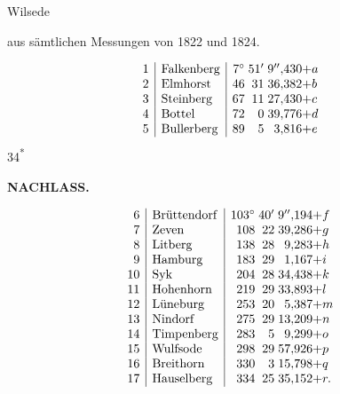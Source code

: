 \medskip
{\centering
[3.]\par\smallskip
Wilsede\par\smallskip
aus sämtlichen Messungen von 1822 und 1824.\par\smallskip
[Annahme.]\par}
\[
\begin{array}{@{}r|l|r@{\;}r@{\;}r@{}l@{}}
 1&\text{Falkenberg}&7^\circ&51'&9''{,}430&+a\\
 2&\text{Elmhorst}&46&31&36{,}382&+b\\
 3&\text{Steinberg}&67&11&27{,}430&+c\\
 4&\text{Bottel}&72&0&39{,}776&+d\\
 5&\text{Bullerberg}&89&5&3{,}816&+e
\end{array}
\]
\noindent\hfill{\small 34\textsuperscript{*}}\hspace*{.12\linewidth}\par

\par\clearpage
\noindent{}\hfill{\small\textbf{NACHLASS.}}\hfill\null\par\medskip

\[
\begin{array}{@{}r|l|r@{\;}r@{\;}r@{}l@{}}
 6&\text{Brüttendorf}&103^\circ&40'&9''{,}194&+f\\
 7&\text{Zeven}&108&22&39{,}286&+g\\
 8&\text{Litberg}&138&28&9{,}283&+h\\
 9&\text{Hamburg}&183&29&1{,}167&+i\\
 10&\text{Syk}&204&28&34{,}438&+k\\
 11&\text{Hohenhorn}&219&29&33{,}893&+l\\
 12&\text{Lüneburg}&253&20&5{,}387&+m\\
 13&\text{Nindorf}&275&29&13{,}209&+n\\
 14&\text{Timpenberg}&283&5&9{,}299&+o\\
 15&\text{Wulfsode}&298&29&57{,}926&+p\\
 16&\text{Breithorn}&330&3&15{,}798&+q\\
 17&\text{Hauselberg}&334&25&35{,}152&+r.
\end{array}
\]

